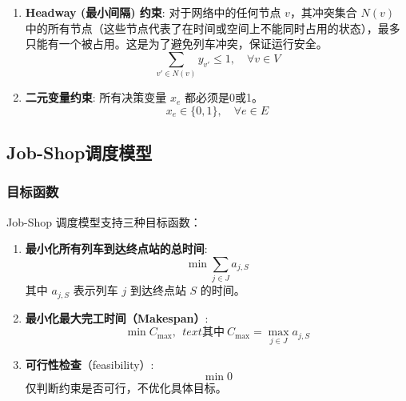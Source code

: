 \documentclass{article}
\begin{document}
\begin{enumerate}
        \item \textbf{Headway (最小间隔) 约束}:
        对于网络中的任何节点 $v$，其冲突集合 $N(v)$
        中的所有节点（这些节点代表了在时间或空间上不能同时占用的状态），最多只能有一个被占用。这是为了避免列车冲突，保证运行安全。
        \begin{equation}
            \sum_{v' \in N(v)} y_{v'} \le 1, \quad \forall v \in
            V\label{eq:con_headway}
        \end{equation}

        \item \textbf{二元变量约束}:
        所有决策变量 $x_e$ 都必须是0或1。
        \begin{equation}
            x_e \in \{0,1\}, \quad \forall e \in E\label{eq:con_binary}
        \end{equation}
    \end{enumerate}

    \subsection{Job-Shop调度模型}

    \subsubsection{目标函数}
    Job-Shop 调度模型支持三种目标函数：

    \begin{enumerate}
        \item \textbf{最小化所有列车到达终点站的总时间}:
        \begin{equation}
            \min \sum_{j \in J} a_{j, S}\label{eq:min\_sum\_arrival}
        \end{equation}
        其中 $a_{j, S}$ 表示列车 $j$ 到达终点站 $S$ 的时间。

        \item \textbf{最小化最大完工时间（Makespan）}:
        \begin{equation}
            \min C_{\max} , \ \ text{其中} \ C_{\max} = \max_{j \in J} a_{j, S}\label{eq:min}
        \end{equation}

        \item \textbf{可行性检查}（feasibility）:
        \begin{equation}
            \min 0\label{eq:feasibility}
        \end{equation}
        仅判断约束是否可行，不优化具体目标。
    \end{enumerate}
\end{document}
